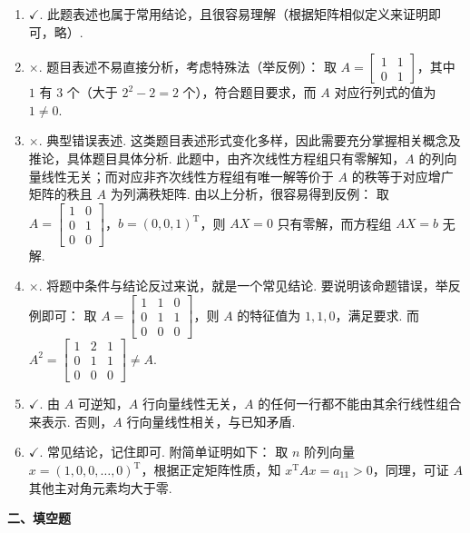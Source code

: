 \documentclass[a4paper,11pt]{ctexart}
\newcommand{\T}{\mathrm{T}}
\begin{document}
\begin{enumerate}[label=\arabic*., leftmargin=2em, itemsep=0.7em, topsep=0.5em]
  \item $\checkmark$. 此题表述也属于常用结论，且很容易理解（根据矩阵相似定义来证明即可，略）.

  \item $\times$. 题目表述不易直接分析，考虑特殊法（举反例）：
  取 $A = \begin{bmatrix} 1 & 1 \\ 0 & 1 \end{bmatrix}$，其中 $1$ 有 $3$ 个（大于 $2^2 - 2 = 2$ 个），符合题目要求，而 $A$ 对应行列式的值为 $1 \neq 0$.

  \item $\times$. 典型错误表述. 这类题目表述形式变化多样，因此需要充分掌握相关概念及推论，具体题目具体分析. 此题中，由齐次线性方程组只有零解知，$A$ 的列向量线性无关；而对应非齐次线性方程组有唯一解等价于 $A$ 的秩等于对应增广矩阵的秩且 $A$ 为列满秩矩阵. 由以上分析，很容易得到反例：
  取 $A = \begin{bmatrix} 1 & 0 \\ 0 & 1 \\ 0 & 0 \end{bmatrix}$，$b = (0, 0, 1)^{\T}$，则 $AX = 0$ 只有零解，而方程组 $AX = b$ 无解.

  \item $\times$. 将题中条件与结论反过来说，就是一个常见结论. 要说明该命题错误，举反例即可：
  取 $A = \begin{bmatrix} 1 & 1 & 0 \\ 0 & 1 & 1 \\ 0 & 0 & 0 \end{bmatrix}$，则 $A$ 的特征值为 $1, 1, 0$，满足要求. 而 $A^2 = \begin{bmatrix} 1 & 2 & 1 \\ 0 & 1 & 1 \\ 0 & 0 & 0 \end{bmatrix} \neq A$.

  \item $\checkmark$. 由 $A$ 可逆知，$A$ 行向量线性无关，$A$ 的任何一行都不能由其余行线性组合来表示. 否则，$A$ 行向量线性相关，与已知矛盾.

  \item $\checkmark$. 常见结论，记住即可. 附简单证明如下：
  取 $n$ 阶列向量 $x = (1, 0, 0, \dots, 0)^{\T}$，根据正定矩阵性质，知 $x^{\T}Ax = a_{11} > 0$，同理，可证 $A$ 其他主对角元素均大于零.
\end{enumerate}

\vspace{0.8em}

\textbf{二、填空题}
\end{document}
